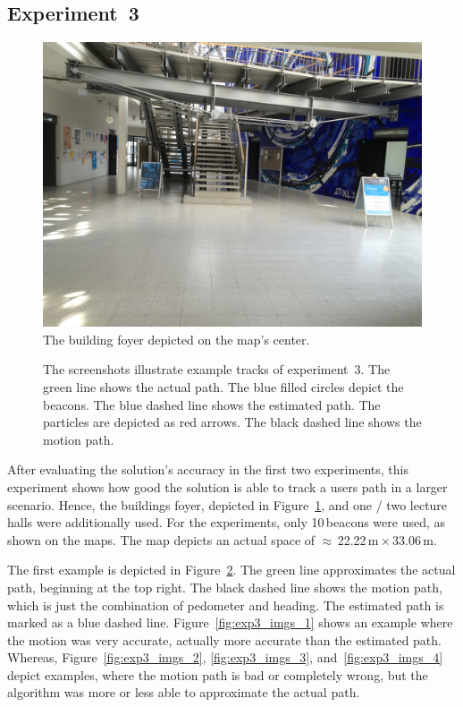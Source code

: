 \subsection*{Experiment~3}
\begin{figure}
	\includegraphics[height=0.4\textheight]{figures/F-Foyer}
	\caption{The building foyer depicted on the map's center.}
	\label{fig:f-foyer}
\end{figure}


\begin{figure}
	
	\caption{The screenshots illustrate example tracks of experiment~3. The green line shows the actual path. The blue filled circles depict the beacons. The blue dashed line shows the estimated path. The particles are depicted as red arrows. The black dashed line shows the motion path.}
	\label{fig:exp3_imgs}
\end{figure}

After evaluating the solution's accuracy in the first two experiments, this experiment shows how good the solution is able to track a users path in a larger scenario. Hence, the buildings foyer, depicted in Figure~\ref{fig:f-foyer}, and one / two lecture halls were additionally used. For the experiments, only 10\,beacons were used, as shown on the maps. The map depicts an actual space of $\approx$\,22.22\,m\,$\times$\,33.06\,m.

The first example is depicted in Figure~\ref{fig:exp3_imgs}. The green line approximates the actual path, beginning at the top right. The black dashed line shows the motion path, which is just the combination of pedometer and heading. The estimated path is marked as a blue dashed line. Figure~\ref{fig:exp3_imgs_1} shows an example where the motion was very accurate, actually more accurate than the estimated path. Whereas, Figure~\ref{fig:exp3_imgs_2}, \ref{fig:exp3_imgs_3}, and~\ref{fig:exp3_imgs_4} depict examples, where the motion path is bad or completely wrong, but the algorithm was more or less able to approximate the actual path.

